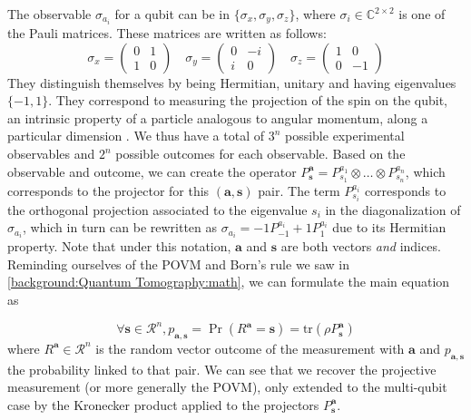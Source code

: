 \documentclass[12pt]{memoir}
\newcommand{\tr}{\text{tr}}
\newcommand{\mb}{\mathbf}
\newcommand{\ti}{\textit}
\begin{document}
The observable $\sigma_{a_i}$ for a qubit can be in $\{\sigma_x, \sigma_y, \sigma_z\}$, where $\sigma_i \in \mathbb{C}^{2 \times 2}$ is one of the Pauli matrices. These matrices are written as follows:
\begin{equation}
    \sigma_x  = \begin{pmatrix}
        0 & 1\\
        1 & 0
    \end{pmatrix}\quad
    \sigma_y = \begin{pmatrix}
        0 & -i\\
        i & 0
    \end{pmatrix}\quad
    \sigma_z = \begin{pmatrix}
        1 & 0\\
        0 & -1
    \end{pmatrix}
\end{equation}
They distinguish themselves by being Hermitian, unitary and having eigenvalues $\{-1, 1\}$. They correspond to measuring the projection of the spin on the qubit, an intrinsic property of a particle analogous to angular momentum, along a particular dimension \cite{wiki:pauli-matrices}.
We thus have a total of $3^n$ possible experimental observables and $2^n$ possible outcomes for each observable. Based on the observable and outcome, we can create the operator $P^\mb a_{\mb s} = P^{a_1}_{s_1} \otimes \dots \otimes P^{a_n}_{s_n}$, which corresponds to the projector for this $(\mb a,\mb s)$ pair. The term $P^{a_i}_{s_i}$ corresponds to the orthogonal projection associated to the eigenvalue $s_i$ in the diagonalization of $\sigma_{a_i}$, which in turn can be rewritten as $\sigma_{a_i} = -1P^{a_i}_{-1} + 1P^{a_i}_1$ due to its Hermitian property. Note that under this notation, $\mb a$ and $\mb s$ are both vectors \ti{and} indices. Reminding ourselves of the POVM and Born's rule we saw in \ref{background:Quantum Tomography:math}, we can formulate the main equation as


\begin{equation}
    \forall \mb s \in \mathcal{R}^n, p_{\mb a,\mb s} = \Pr(R^{\mb a} = \mb s) = \tr(\rho P^{\mb a}_{\mb s})
\end{equation}
where $R^\mb{a} \in \mathcal{R}^n$ is the random vector outcome of the measurement with $\mb a$ and $p_{\mb a,\mb s}$ the probability linked to that pair. We can see that we recover the projective measurement (or more generally the POVM), only extended to the multi-qubit case by the Kronecker product applied to the projectors $P^{\mb a}_\mb{ s}$.\medbreak
\end{document}
